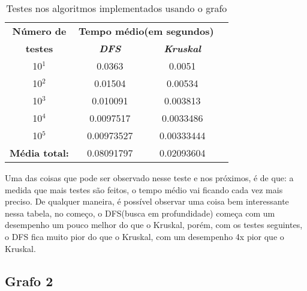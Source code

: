 \documentclass[12pt]{article}
\begin{document}
  \begin{table}[htbp]
    \caption{Testes nos algoritmos implementados usando o grafo }
    \begin{center}
    \begin{tabular}{|c|c|c|c|}
    \hline
    \textbf{Número de}&\multicolumn{2}{|c|}{\textbf{Tempo médio(em segundos)}} \\
    \cline{2-3} 
    \textbf{testes} & \textbf{\textit{DFS}}& \textbf{\textit{Kruskal}} \\
    \hline
    10$^{\mathrm{1}}$& 0.0363 & 0.0051 \\
    \hline
    10$^{\mathrm{2}}$& 0.01504 & 0.00534 \\
    \hline
    10$^{\mathrm{3}}$& 0.010091 & 0.003813 \\
    \hline
    10$^{\mathrm{4}}$& 0.0097517 & 0.0033486 \\
    \hline
    10$^{\mathrm{5}}$& 0.00973527 & 0.00333444 \\
    \hline
    \textbf{Média total:} & 0.08091797 & 0.02093604 \\
    \hline
    \end{tabular}
    \end{center}
  \end{table}

  Uma das coisas que pode ser observado nesse teste e nos próximos, é de que: a medida que 
  mais testes são feitos, o tempo médio vai ficando cada vez mais preciso. De qualquer maneira,
  é possível observar uma coisa bem interessante nessa tabela, no começo, o DFS(busca em profundidade)
  começa com um desempenho um pouco melhor do que o Kruskal, porém, com os testes seguintes, 
  o DFS fica muito pior do que o Kruskal, com um desempenho 4x pior que o Kruskal.

  \newpage

  \subsection{Grafo 2}
\end{document}
